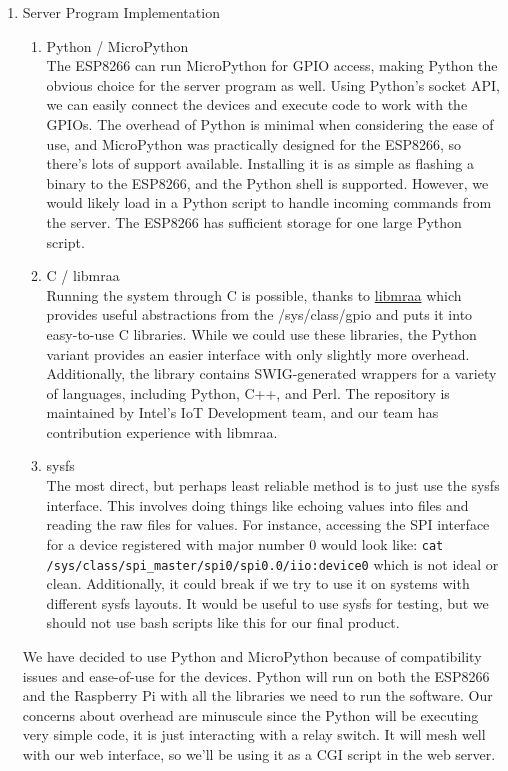 \documentclass[12pt]{article}
\begin{document}
\begin{enumerate}
    \item Server Program Implementation
        \begin{enumerate}
            \item Python / MicroPython \\
            The ESP8266 can run MicroPython for GPIO access, making Python the obvious choice for the server program as well. Using Python's socket API, we can easily connect the devices and execute code to work with the GPIOs. The overhead of Python is minimal when considering the ease of use, and MicroPython was practically designed for the ESP8266, so there's lots of support available. Installing it is as simple as flashing a binary to the ESP8266, and the Python shell is supported. However, we would likely load in a Python script to handle incoming commands from the server. The ESP8266 has sufficient storage for one large Python script.
            \item C / libmraa \\
            Running the system through C is possible, thanks to \href{https://github.com/intel-iot-devkit/mraa}{libmraa} which provides useful abstractions from the /sys/class/gpio and puts it into easy-to-use C libraries. While we could use these libraries, the Python variant provides an easier interface with only slightly more overhead. Additionally, the library contains SWIG-generated wrappers for a variety of languages, including Python, C++, and Perl. The repository is maintained by Intel's IoT Development team, and our team has contribution experience with libmraa. 
            \item sysfs \\
            The most direct, but perhaps least reliable method is to just use the sysfs interface. This involves doing things like echoing values into files and reading the raw files for values. For instance, accessing the SPI interface for a device registered with major number 0 would look like: \verb|cat /sys/class/spi_master/spi0/spi0.0/iio:device0| which is not ideal or clean. Additionally, it could break if we try to use it on systems with different sysfs layouts. It would be useful to use sysfs for testing, but we should not use bash scripts like this for our final product. 
        \end{enumerate}
        We have decided to use Python and MicroPython because of compatibility issues and ease-of-use for the devices. Python will run on both the ESP8266 and the Raspberry Pi with all the libraries we need to run the software. Our concerns about overhead are minuscule since the Python will be executing very simple code, it is just interacting with a relay switch. It will mesh well with our web interface, so we'll be using it as a CGI script in the web server.

\end{enumerate}
\end{document}
